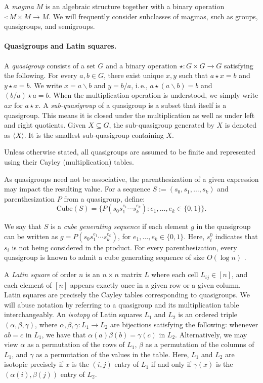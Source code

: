\documentclass{theoretics}
\begin{document}
\noindent A \textit{magma} $M$ is an algebraic structure together with a binary operation $\cdot : M \times M \to M$. We will frequently consider subclasses of magmas, such as groups, quasigroups, and semigroups. 

\paragraph{Quasigroups and Latin squares.} A \textit{quasigroup} consists of a set $G$ and a binary operation $\star : G \times G \to G$ satisfying the following. For every $a, b \in G$, there exist unique $x, y$ such that $a \star x = b$ and $y \star a = b$.  We write $x = a\backslash b$ and $y = b/a$, i.\,e., $a\star (a\backslash b) = b$ and $ (b/a) \star a = b$. When the multiplication operation is understood, we simply write $ax$ for $a \star x$. A \emph{sub-quasigroup} of a quasigroup is a subset that itself is a quasigroup. This means it is closed under the multiplication as well as under left and right quotients. Given $X \subseteq G$, the sub-quasigroup generated by $X$ is denoted as $ \langle X \rangle$. It is the smallest sub-quasigroup containing $X$.

Unless otherwise stated, all quasigroups are assumed to be finite and represented using their Cayley (multiplication) tables. 




As quasigroups need not be associative, the parenthesization of a given expression may impact the resulting value.  For a sequence $S := (s_{0}, s_{1}, \ldots, s_{k})$ and parenthesization $P$ from a quasigroup, define:
\[
\text{Cube}(S) = \{ P(s_{0}s_{1}^{e_{1}} \cdots s_{k}^{e_{k}}) : e_{1}, \ldots, e_{k} \in \{0,1\} \}.
\]

We say that $S$ is a \textit{cube generating sequence} if each element $g$ in the quasigroup can be written as $g = P(s_{0}s_{1}^{e_{1}} \cdots s_{k}^{e_{k}})$, for $e_{1}, \ldots, e_{k} \in \{0,1\}$. Here, $s_{i}^{0}$ indicates that $s_{i}$ is not being considered in the product.  For every parenthesization, every quasigroup is known to admit a cube generating sequence of size $O(\log n)$ \cite{ChattopadhyayToranWagner}.


A \textit{Latin square} of order $n$ is an $n \times n$ matrix $L$ where each cell $L_{ij} \in [n]$, and each element of $[n]$ appears exactly once in a given row or a given column. Latin squares are precisely the Cayley tables corresponding to quasigroups. We will abuse notation by referring to a quasigroup and its multiplication table interchangeably. An \textit{isotopy} of Latin squares $L_{1}$ and $L_{2}$ is an ordered triple $(\alpha, \beta, \gamma)$, where $\alpha, \beta, \gamma : L_{1} \to L_{2}$ are bijections satisfying the following: whenever $ab = c$ in $L_{1}$, we have that $\alpha(a)\beta(b) = \gamma(c)$ in $L_{2}$. Alternatively, we may view $\alpha$ as a permutation of the rows of $L_{1}$, $\beta$ as a permutation of the columns of $L_{1}$, and $\gamma$ as a permutation of the values in the table. Here, $L_{1}$ and $L_{2}$ are isotopic precisely if $x$ is the $(i,j)$ entry of $L_{1}$ if and only if $\gamma(x)$ is the $(\alpha(i), \beta(j))$ entry of $L_{2}$.
\end{document}
